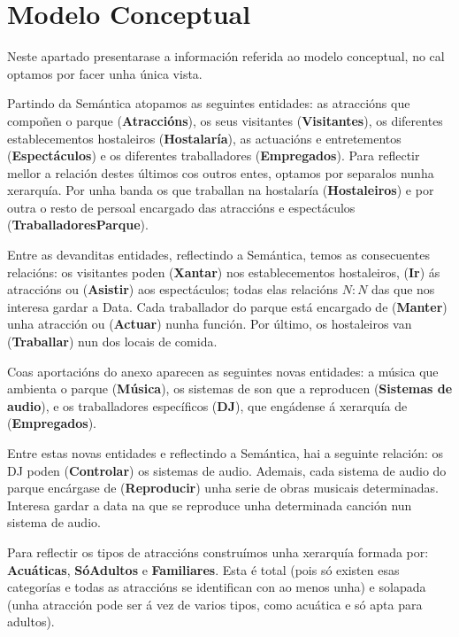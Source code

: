 \documentclass[12pt,a4paper]{book}
\theoremstyle{definition}
\theoremstyle{break}
\begin{document}
\chapter{Modelo Conceptual}
Neste apartado presentarase a información referida ao modelo conceptual, no cal optamos por facer unha única vista.

Partindo da Semántica atopamos as seguintes entidades: as atraccións que compoñen o parque (\textbf{Atraccións}), os seus visitantes (\textbf{Visitantes}), os diferentes establecementos hostaleiros (\textbf{Hostalaría}), as actuacións e entretementos (\textbf{Espectáculos}) e os diferentes traballadores (\textbf{Empregados}). Para reflectir mellor a relación destes últimos cos outros entes, optamos por separalos nunha xerarquía. Por unha banda os que traballan na hostalaría (\textbf{Hostaleiros}) e por outra o resto de persoal encargado das atraccións e espectáculos (\textbf{TraballadoresParque}).

Entre as devanditas entidades, reflectindo a Semántica, temos as consecuentes relacións: os visitantes poden (\textbf{Xantar}) nos establecementos hostaleiros, (\textbf{Ir}) ás atraccións ou (\textbf{Asistir}) aos espectáculos; todas elas relacións $N:N$ das que nos interesa gardar a Data. Cada traballador do parque está encargado de (\textbf{Manter}) unha atracción ou (\textbf{Actuar}) nunha función. Por último, os hostaleiros van (\textbf{Traballar}) nun dos locais de comida.

Coas aportacións do anexo aparecen as seguintes novas entidades: a música que ambienta o
parque (\textbf{Música}), os sistemas de son que a reproducen (\textbf{Sistemas de audio}),
e os traballadores específicos (\textbf{DJ}), que engádense á xerarquía de (\textbf{Empregados}).

Entre estas novas entidades e reflectindo a Semántica, hai a seguinte relación: os DJ poden (\textbf{Controlar}) os sistemas de audio. Ademais, cada sistema
de audio do parque encárgase de (\textbf{Reproducir}) unha serie de obras musicais determinadas. Interesa gardar a data na que se reproduce unha determinada
canción nun sistema de audio.

Para reflectir os tipos de atraccións construímos unha xerarquía formada por: \textbf{Acuáticas}, \textbf{SóAdultos} e
\textbf{Familiares}. Esta é total (pois só existen esas categorías e todas as atraccións se
identifican con ao menos unha) e solapada (unha atracción pode ser á vez de varios
tipos, como acuática e só apta para adultos).
\end{document}
